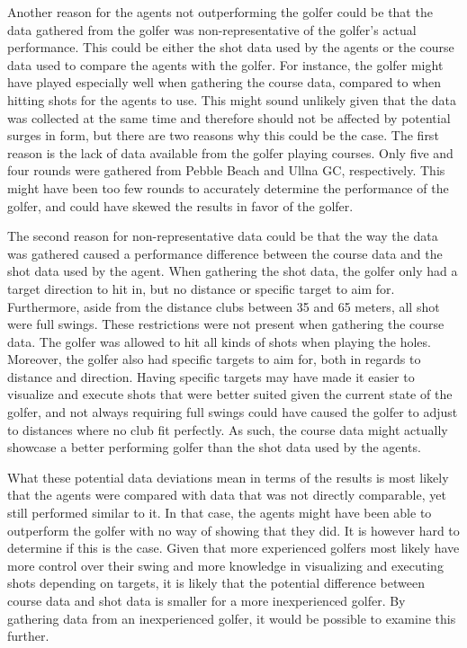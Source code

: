 \documentclass{kththesis}
\begin{document}
Another reason for the agents not outperforming the golfer could be that the data gathered from the golfer was non-representative of the golfer's actual performance. This could be either the shot data used by the agents or the course data used to compare the agents with the golfer. For instance, the golfer might have played especially well when gathering the course data, compared to when hitting shots for the agents to use. This might sound unlikely given that the data was collected at the same time and therefore should not be affected by potential surges in form, but there are two reasons why this could be the case. The first reason is the lack of data available from the golfer playing courses. Only five and four rounds were gathered from Pebble Beach and Ullna GC, respectively. This might have been too few rounds to accurately determine the performance of the golfer, and could have skewed the results in favor of the golfer.

The second reason for non-representative data could be that the way the data was gathered caused a performance difference between the course data and the shot data used by the agent. When gathering the shot data, the golfer only had a target direction to hit in, but no distance or specific target to aim for. Furthermore, aside from the distance clubs between 35 and 65 meters, all shot were full swings. These restrictions were not present when gathering the course data. The golfer was allowed to hit all kinds of shots when playing the holes. Moreover, the golfer also had specific targets to aim for, both in regards to distance and direction. Having specific targets may have made it easier to visualize and execute shots that were better suited given the current state of the golfer, and not always requiring full swings could have caused the golfer to adjust to distances where no club fit perfectly. As such, the course data might actually showcase a better performing golfer than the shot data used by the agents.

What these potential data deviations mean in terms of the results is most likely that the agents were compared with data that was not directly comparable, yet still performed similar to it. In that case, the agents might have been able to outperform the golfer with no way of showing that they did. It is however hard to determine if this is the case. Given that more experienced golfers most likely have more control over their swing and more knowledge in visualizing and executing shots depending on targets, it is likely that the potential difference between course data and shot data is smaller for a more inexperienced golfer. By gathering data from an inexperienced golfer, it would be possible to examine this further.
\end{document}
